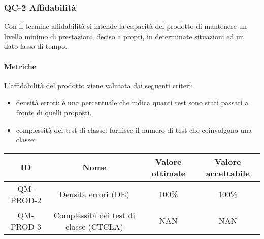 \subsubsection{QC-2 Affidabilità}
Con il termine affidabilità si intende la capacità del prodotto di mantenere un livello minimo di prestazioni, deciso a propri, in determinate situazioni ed un dato lasso di tempo.
	
	\paragraph{Metriche}
	L'affidabilità del prodotto viene valutata dai seguenti criteri:
	\begin{itemize}
		\item densità errori: è una percentuale che indica quanti test sono stati passati a fronte di quelli proposti.
		\item complessità dei test di classe: fornisce il numero di test che coinvolgono una classe;
	\end{itemize}
	\begin{center}	
		\begin{tabular}{|c|c|c|c|}
			\rowcolor{lighter-grayer}
			\hline
			ID & Nome & Valore ottimale & Valore accettabile \\
			\hline
			QM-PROD-2 & Densità errori (DE) & 100\% & 100\% \\
			\hline
			QM-PROD-3 & Complessità dei test di classe (CTCLA) & NAN & NAN \\
			\hline
		\end{tabular}
	\end{center}
